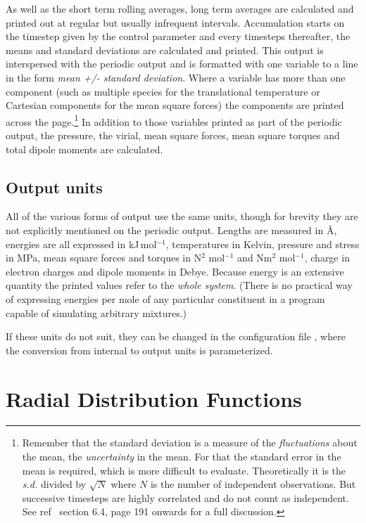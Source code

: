 \documentclass[a4paper,twoside]{report}
\begin{document}
As well as the short term rolling averages, long term averages are
calculated and printed out at regular but usually infrequent
intervals.  Accumulation starts on the timestep given by the control
parameter  and every 
timesteps thereafter, the means and standard deviations are calculated
and printed.  This output is interspersed with the periodic output and
is formatted with one variable to a line in the form \emph{mean +/-
  standard deviation}. Where a variable has more than one component (such as
multiple species for the translational temperature or Cartesian
components for the mean square forces) the components are printed
across the page.\footnote{Remember that the standard deviation is a
  measure of the \emph{fluctuations} about the mean,  the
  \emph{uncertainty} in the mean. For that the standard error in the
  mean is required, which is more difficult to evaluate.
  Theoretically it is the \emph{s.d.} divided by $\sqrt N$ where $N$
  is the number of independent observations.  But successive timesteps
  are highly correlated and do not count as independent.  See
  ref~\cite{allen:87} section 6.4, page 191 onwards for a full
  discussion.}  In addition to those variables printed as part of the
periodic output, the pressure, the virial, mean square forces, mean
square torques and total dipole moments are calculated.

\subsection{Output units}
All of the various forms of output use the same units, though for
brevity they are not explicitly mentioned on the periodic output.
Lengths are measured in {\AA}, energies are all expressed in
kJ\,mol$^{-1}$, temperatures in Kelvin, pressure and stress in MPa,
mean square forces and torques in N$^2$ mol$^{-1}$ and Nm$^2$
mol$^{-1}$, charge in electron charges and dipole moments in Debye.
Because energy is an extensive quantity the printed values refer to
the \emph{whole system}.  (There is no practical way of expressing
energies per mole of any particular constituent in a program capable
of simulating arbitrary mixtures.)

If these units do not suit, they can be changed in the configuration
file , where the conversion from internal to output units
is parameterized.
\section{Radial Distribution Functions}%
\end{document}
